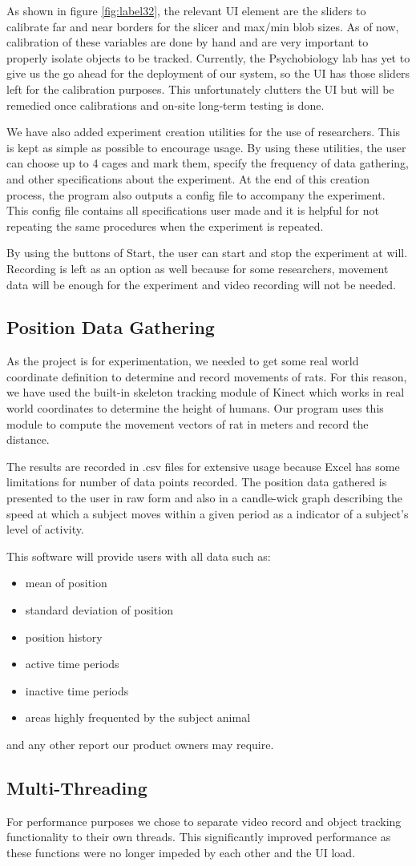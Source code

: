 As shown in figure \ref{fig:label32}, the relevant UI element are the sliders to calibrate far and near borders for the slicer and max/min blob sizes. As of now, calibration of these variables are done by hand and are very important to properly isolate objects to be tracked. Currently, the Psychobiology lab has yet to give us the go ahead for the deployment of our system, so the UI has those sliders left for the calibration purposes. This unfortunately clutters the UI but will be remedied once calibrations and on-site long-term testing is done.

We have also added experiment creation utilities for the use of researchers. This is kept as simple as possible to encourage usage. By using these utilities, the user can choose up to 4 cages and mark them, specify the frequency of data gathering, and other specifications about the experiment. At the end of this creation process, the program also outputs a config file to accompany the experiment. This config file contains all specifications user made and it is helpful for not repeating the same procedures when the experiment is repeated.

By using the buttons of Start, the user can start and stop the experiment at will. Recording is left as an option as well because for some researchers, movement data will be enough for the experiment and video recording will not be needed.
\subsection{Position Data Gathering}
As the project is for experimentation, we needed to get some real world coordinate definition to determine and record movements of rats. For this reason, we have used the built-in skeleton tracking module of Kinect which works in real world coordinates to determine the height of humans. Our program uses this module to compute the movement vectors of rat in meters and record the distance.

The results are recorded in .csv files for extensive usage because Excel has some limitations for number of data points recorded. The position data gathered is presented to the user in raw form and also in a candle-wick graph describing the speed at which a subject moves within a given period as a indicator of a subject’s level of activity.

This software will provide users with all data such as: 
\begin{itemize}
\item mean of position
\item standard deviation of position
\item position history
\item active time periods
\item inactive time periods
\item areas highly frequented by the subject animal
\end{itemize}
and any other report our product owners may require.

\subsection{Multi-Threading}
For performance purposes we chose to separate video record and object tracking functionality to their own threads. This significantly improved performance as these functions were no longer impeded by each other and the UI load.

